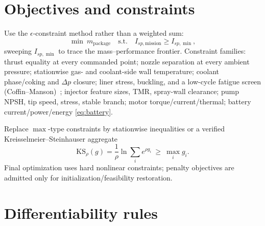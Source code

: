 \documentclass[11pt]{article}
\begin{document}
\section{Objectives and constraints}

Use the $\epsilon$-constraint method rather than a weighted sum:
\begin{equation}
\min\ m_\mathrm{package}\quad\text{s.t.}\quad I_{sp,\mathrm{mission}}\ge I_{sp,\min},
\end{equation}
sweeping $I_{sp,\min}$ to trace the mass--performance frontier. Constraint
families: thrust equality at every commanded point; nozzle separation at every
ambient pressure; stationwise gas- and coolant-side wall temperature; coolant
phase/coking and $\Delta p$ closure; liner stress, buckling, and a low-cycle
fatigue screen (Coffin--Manson)~\cite{narloy1974,porowski1985}; injector feature
sizes, TMR, spray-wall clearance; pump NPSH, tip speed, stress, stable branch;
motor torque/current/thermal; battery current/power/energy \eqref{eq:battery}.

Replace $\max$-type constraints by stationwise inequalities or a verified
Kreisselmeier--Steinhauser aggregate
\begin{equation}
\mathrm{KS}_\rho(g)=\frac{1}{\rho}\ln\!\sum_i e^{\rho g_i}\ \ge\ \max_i g_i .
\end{equation}
Final optimization uses hard nonlinear constraints; penalty objectives are
admitted only for initialization/feasibility restoration.

\section{Differentiability rules}
\label{sec:diffrules}
\end{document}
